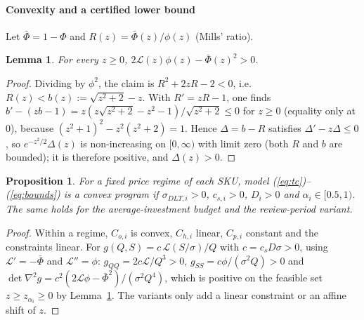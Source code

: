\documentclass[preprint,12pt,authoryear]{elsarticle}
\newtheorem{proposition}{Proposition}
\newtheorem{lemma}{Lemma}
\begin{document}
\paragraph{Convexity and a certified lower bound} Let $\bar\Phi=1-\Phi$ and $R(z)=\bar\Phi(z)/\phi(z)$ (Mills' ratio).

\begin{lemma}\label{lem:mills}
For every $z\ge0$, $2\mathcal{L}(z)\phi(z)-\bar\Phi(z)^2>0$.
\end{lemma}
\begin{proof}
Dividing by $\phi^2$, the claim is $R^2+2zR-2<0$, i.e.\ $R(z)<b(z):=\sqrt{z^2+2}-z$. With $R'=zR-1$, one finds $b'-(zb-1)=z(z\sqrt{z^2+2}-z^2-1)/\sqrt{z^2+2}\le0$ for $z\ge0$ (equality only at $0$), because $(z^2+1)^2-z^2(z^2+2)=1$. Hence $\Delta=b-R$ satisfies $\Delta'-z\Delta\le0$, so $e^{-z^2/2}\Delta(z)$ is non-increasing on $[0,\infty)$ with limit zero (both $R$ and $b$ are bounded); it is therefore positive, and $\Delta(z)>0$.
\end{proof}

\begin{proposition}\label{prop:convex}
For a fixed price regime of each SKU, model (\ref{eq:tc})--(\ref{eq:bounds}) is a convex program if $\sigma_{DLT,i}>0$, $c_{s,i}>0$, $D_i>0$ and $\alpha_i\in[0.5,1)$. The same holds for the average-investment budget and the review-period variant.
\end{proposition}
\begin{proof}
Within a regime, $C_{o,i}$ is convex, $C_{h,i}$ linear, $C_{p,i}$ constant and the constraints linear. For $g(Q,S)=c\,\mathcal{L}(S/\sigma)/Q$ with $c=c_sD\sigma>0$, using $\mathcal{L}'=-\bar\Phi$ and $\mathcal{L}''=\phi$: $g_{QQ}=2c\mathcal{L}/Q^3>0$, $g_{SS}=c\phi/(\sigma^2Q)>0$ and $\det\nabla^2g=c^2(2\mathcal{L}\phi-\bar\Phi^2)/(\sigma^2Q^4)$, which is positive on the feasible set $z\ge z_{\alpha_i}\ge0$ by Lemma~\ref{lem:mills}. The variants only add a linear constraint or an affine shift of $z$.
\end{proof}
\end{document}
